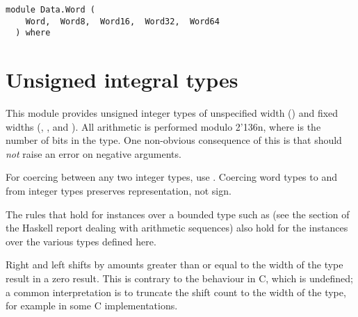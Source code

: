 \label{module:Data.Word}
\haddockbeginheader
{\haddockverb\begin{verbatim}
module Data.Word (
    Word,  Word8,  Word16,  Word32,  Word64
  ) where\end{verbatim}}
\haddockendheader

\section{Unsigned integral types
}
This module provides unsigned integer types of unspecified width ()
and fixed widths (, ,  and ).  All
arithmetic is performed modulo 2{\char '136}n, where  is the number of bits in
the type.  One non-obvious consequence of this is that 
  should \emph{not} raise an error on negative arguments.
\par
For coercing between any two integer types, use
.  Coercing word types to and from integer
types preserves representation, not sign.
\par
The rules that hold for  instances over a bounded type
such as  (see the section of the Haskell report dealing
with arithmetic sequences) also hold for the  instances
over the various  types defined here.
\par
Right and left shifts by amounts greater than or equal to the width of
the type result in a zero result.  This is contrary to the behaviour
in C, which is undefined; a common interpretation is to truncate the
shift count to the width of the type, for example  in
some C implementations.
\par

